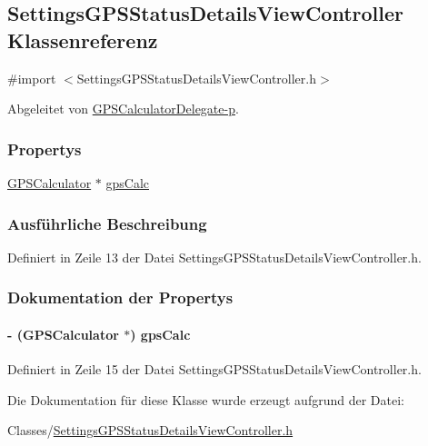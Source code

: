 \hypertarget{interface_settings_g_p_s_status_details_view_controller}{
\subsection{SettingsGPSStatusDetailsViewController Klassenreferenz}
\label{interface_settings_g_p_s_status_details_view_controller}
}


{\ttfamily \#import $<$SettingsGPSStatusDetailsViewController.h$>$}

Abgeleitet von \hyperlink{protocol_g_p_s_calculator_delegate-p}{GPSCalculatorDelegate-\/p}.\subsubsection*{Propertys}
\begin{DoxyCompactItemize}
\item 
\hyperlink{interface_g_p_s_calculator}{GPSCalculator} $\ast$ \hyperlink{interface_settings_g_p_s_status_details_view_controller_a6dece9c5b95a3731cbb7d6f79636345c}{gpsCalc}
\end{DoxyCompactItemize}


\subsubsection{Ausführliche Beschreibung}


Definiert in Zeile 13 der Datei SettingsGPSStatusDetailsViewController.h.

\subsubsection{Dokumentation der Propertys}
\hypertarget{interface_settings_g_p_s_status_details_view_controller_a6dece9c5b95a3731cbb7d6f79636345c}{
\paragraph[{gpsCalc}]{\setlength{\rightskip}{0pt plus 5cm}-\/ ({\bf GPSCalculator} $\ast$) gpsCalc}\hfill}
\label{interface_settings_g_p_s_status_details_view_controller_a6dece9c5b95a3731cbb7d6f79636345c}


Definiert in Zeile 15 der Datei SettingsGPSStatusDetailsViewController.h.

Die Dokumentation für diese Klasse wurde erzeugt aufgrund der Datei:\begin{DoxyCompactItemize}
\item 
Classes/\hyperlink{_settings_g_p_s_status_details_view_controller_8h}{SettingsGPSStatusDetailsViewController.h}\end{DoxyCompactItemize}
